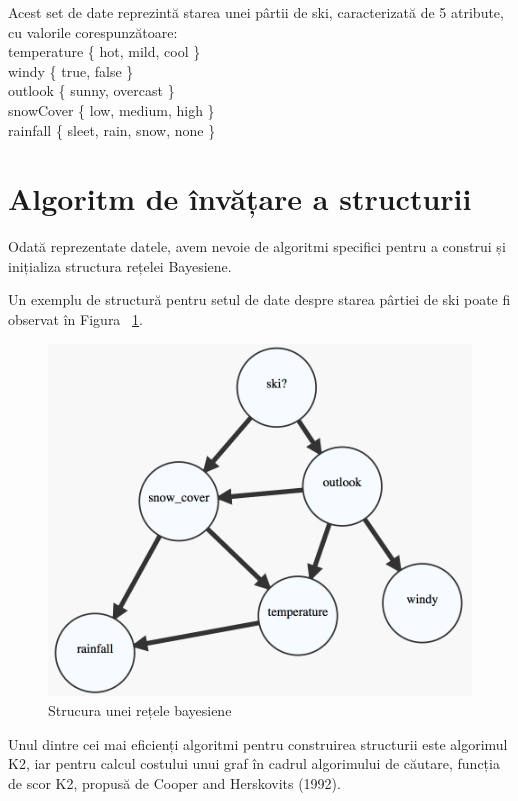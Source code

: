Acest set de date reprezintă starea unei pârtii de ski, caracterizată de 5 atribute, cu valorile corespunzătoare:\\
temperature \{ hot, mild, cool \}\\
windy \{ true, false \}\\
outlook \{ sunny, overcast \}\\
snowCover \{ low, medium, high \}\\
rainfall \{ sleet, rain, snow, none \}\\

\section{Algoritm de învățare a structurii}

Odată reprezentate datele, avem nevoie de algoritmi specifici pentru a construi și inițializa structura rețelei Bayesiene.

Un exemplu de structură pentru setul de date despre starea pârtiei de ski poate fi observat în Figura ~\ref{fig:structure}.

\begin{figure}[th]
\centering
\includegraphics[scale=0.4]{Figures/structure}
\decoRule
\caption{Strucura unei rețele bayesiene}
\label{fig:structure}
\end{figure}

Unul dintre cei mai eficienți algoritmi pentru construirea structurii este algorimul K2, iar pentru calcul costului unui graf în cadrul algorimului de căutare, funcția de scor K2, propusă de Cooper and Herskovits (1992). \cite{carvalho2009scoring}

